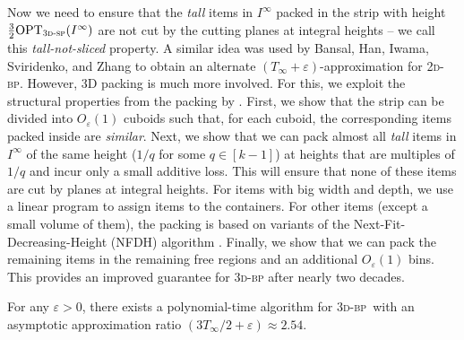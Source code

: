 \documentclass[a4paper,UKenglish,cleveref, autoref, thm-restate]{lipics-v2021}
\newcommand{\eps}{\varepsilon}
\newcommand{\opt}{\mathrm{OPT}}
\newcommand{\twobp}{\textsc{2d-bp}\xspace}
\newcommand{\tbp}{\textsc{3d-bp}\xspace}
\newcommand{\tsp}{\textsc{3d-sp}\xspace}
\begin{document}
  Now we need to ensure that the {\em tall} items in $I^{\infty}$ packed in the strip with height $\frac32\opt_{\tsp}(I^{\infty})$ are not cut by the cutting planes at integral heights -- we call this {\em tall-not-sliced} property. A similar idea was used by Bansal, Han, Iwama, Sviridenko, and Zhang \cite{bansal2007harmonic} to obtain an alternate $(T_{\infty}+\eps)$-approximation for \twobp. However, 3D packing is much more involved.
  For this, we exploit the structural properties from the packing by \cite{3d-strip-packing}.
  First, we show that the strip can be divided into $O_\eps(1)$ cuboids such that, for each cuboid, the corresponding items packed inside are {\em similar}. 
  Next, we show that we can pack almost all {\em tall} items in $I^{\infty}$  of the same height ($1/q$ for some $q \in [k-1]$) at heights that are multiples of $1/q$  and incur only a small additive loss. This will ensure that none of these items are cut by planes at integral heights. For items with big width and depth, we use a linear program to assign items to the containers. For other items (except a small volume of them), the packing is based on variants of the Next-Fit-Decreasing-Height (NFDH) algorithm \cite{coffman1980performance}. 
  Finally, we show that we can pack the remaining items in the remaining free regions and an additional $O_{\eps}(1)$ bins. 
  This provides an improved guarantee for \tbp after nearly two decades.


\begin{theorem}
\label{thm:3dbpasymp}
    For any $\eps >0$, there exists a polynomial-time algorithm for \tbp~with an asymptotic approximation ratio $(3T_{\infty}/2+\eps) \approx 2.54$.
\end{theorem}
\end{document}
